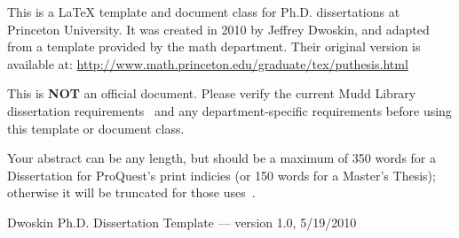 This is a \LaTeX{} template and document class for Ph.D. dissertations at Princeton University. It was created in 2010 by Jeffrey Dwoskin, and adapted from a template provided by the math department. Their original version is available at: \url{http://www.math.princeton.edu/graduate/tex/puthesis.html}

This is \textbf{NOT} an official document. Please verify the current Mudd Library dissertation requirements~\cite{mudd2009} and any department-specific requirements before using this template or document class.


Your abstract can be any length, but should be a maximum of 350 words for a Dissertation for ProQuest's print indicies (or 150 words for a Master's Thesis); otherwise it will be truncated for those uses~\cite{proquest2006}.


Dwoskin Ph.D. Dissertation Template --- version 1.0, 5/19/2010
